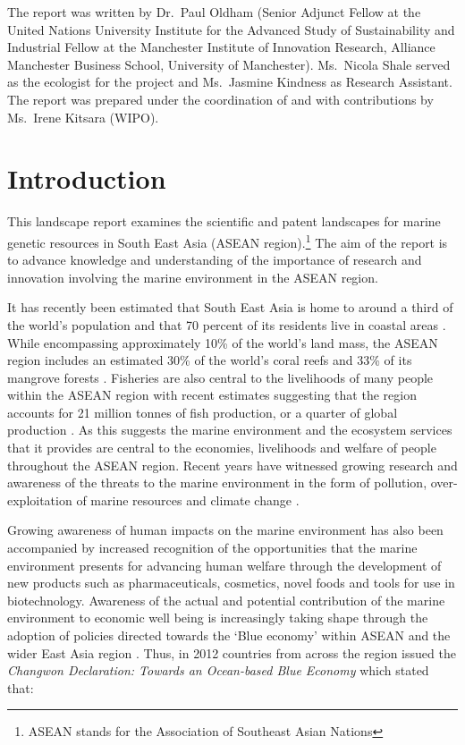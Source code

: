 \documentclass[]{book}
\theoremstyle{definition}
\theoremstyle{definition}
\theoremstyle{definition}
\theoremstyle{remark}
\begin{document}
The report was written by Dr.~Paul Oldham (Senior Adjunct Fellow at the
United Nations University Institute for the Advanced Study of
Sustainability and Industrial Fellow at the Manchester Institute of
Innovation Research, Alliance Manchester Business School, University of
Manchester). Ms.~Nicola Shale served as the ecologist for the project
and Ms.~Jasmine Kindness as Research Assistant. The report was prepared
under the coordination of and with contributions by Ms.~Irene Kitsara
(WIPO).

\hypertarget{intro}{%
\chapter{Introduction}\label{intro}}

This landscape report examines the scientific and patent landscapes for
marine genetic resources in South East Asia (ASEAN region).\footnote{ASEAN
  stands for the Association of Southeast Asian Nations} The aim of the
report is to advance knowledge and understanding of the importance of
research and innovation involving the marine environment in the ASEAN
region.

It has recently been estimated that South East Asia is home to around a
third of the world's population and that 70 percent of its residents
live in coastal areas \citep[Olewiler in][]{Marine_2016}. While
encompassing approximately 10\% of the world's land mass, the ASEAN
region includes an estimated 30\% of the world's coral reefs and 33\% of
its mangrove forests \citep{Marine_2016}. Fisheries are also central to
the livelihoods of many people within the ASEAN region with recent
estimates suggesting that the region accounts for 21 million tonnes of
fish production, or a quarter of global production \citep[Ferrer
in][]{Marine_2016}. As this suggests the marine environment and the
ecosystem services that it provides are central to the economies,
livelihoods and welfare of people throughout the ASEAN region. Recent
years have witnessed growing research and awareness of the threats to
the marine environment in the form of pollution, over-exploitation of
marine resources and climate change \citep{Marine_2016}.

Growing awareness of human impacts on the marine environment has also
been accompanied by increased recognition of the opportunities that the
marine environment presents for advancing human welfare through the
development of new products such as pharmaceuticals, cosmetics, novel
foods and tools for use in biotechnology. Awareness of the actual and
potential contribution of the marine environment to economic well being
is increasingly taking shape through the adoption of policies directed
towards the `Blue economy' within ASEAN and the wider East Asia region
\citep{Gamage_2016}. Thus, in 2012 countries from across the region
issued the \emph{Changwon Declaration: Towards an Ocean-based Blue
Economy} which stated that:
\end{document}

